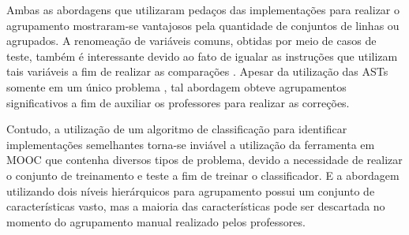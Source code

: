 		Ambas as abordagens que utilizaram pedaços das implementações para realizar
		o agrupamento \cite{Glassman:2015,Wei2015} mostraram-se vantajosos pela
		quantidade de conjuntos de linhas ou  agrupados. A renomeação
		de variáveis comuns, obtidas por meio de casos de teste, também é interessante
		devido ao fato de igualar as instruções que utilizam tais variáveis a fim de
		realizar as comparações \cite{Glassman:2015}. Apesar da utilização das ASTs
		somente em um único problema \cite{Yin:2015}, tal abordagem obteve agrupamentos
		significativos a fim de auxiliar os professores para realizar as correções.
		
		Contudo, a utilização de um algoritmo de classificação para identificar
		implementações semelhantes \cite{Taherkhani:2012} torna-se inviável a utilização
		da ferramenta em MOOC que contenha diversos tipos de problema, devido a necessidade
		de realizar o conjunto de treinamento e teste a fim de treinar o classificador.
		E a abordagem utilizando dois níveis hierárquicos para agrupamento \cite{Glassman:2014}   %
		possui um conjunto de características vasto, mas a maioria das características pode
		ser descartada no momento do agrupamento manual realizado pelos professores.
